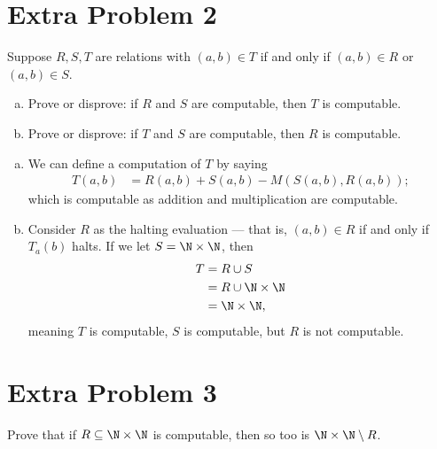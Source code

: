 \documentclass[10pt]{mypackage}
\begin{document}
\section{Extra Problem 2}%
\begin{problem}
  Suppose $R,S,T$ are relations with $\left(a,b\right)\in T$ if and only if $\left(a,b\right)\in R$ or $\left(a,b\right)\in S$.
  \begin{enumerate}[(a)]
    \item Prove or disprove: if $R$ and $S$ are computable, then $T$ is computable.
    \item Prove or disprove: if $T$ and $S$ are computable, then $R$ is computable.
  \end{enumerate}
\end{problem}
\begin{solution}\hfill
  \begin{enumerate}[(a)]
    \item We can define a computation of $T$ by saying
      \begin{align*}
        T\left(a,b\right) &= R\left(a,b\right) + S\left(a,b\right) - M\left(S(a,b),R(a,b)\right);
      \end{align*}
      which is computable as addition and multiplication are computable.
    \item Consider $R$ as the halting evaluation --- that is, $\left(a,b\right)\in R$ if and only if $T_{a}(b)$ halts. If we let $S = \N\times \N$, then
      \begin{align*}
        T &= R\cup S\\
          &= R\cup \N\times \N\\
          &= \N\times \N,
      \end{align*}
      meaning $T$ is computable, $S$ is computable, but $R$ is not computable.
  \end{enumerate}
\end{solution}

\section{Extra Problem 3}%
\begin{problem}
  Prove that if $R\subseteq \N\times \N$ is computable, then so too is $\N\times \N\setminus R$.
\end{problem}
\end{document}
